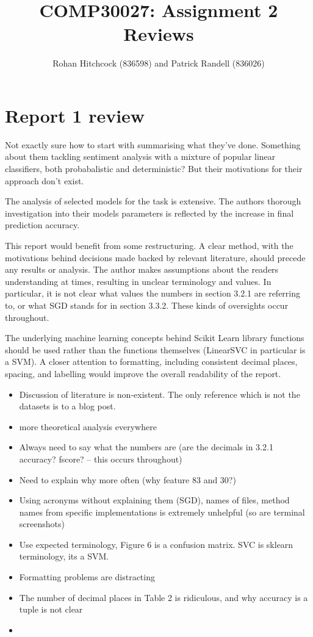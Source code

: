 \documentclass[11pt]{article}
\newcommand{\drafting}[1]{\textcolor{OliveGreen}{#1}}
\begin{document}
\title{\textbf{COMP30027: Assignment 2 Reviews}}
\author{Rohan Hitchcock (836598) and Patrick Randell (836026)}
\date{}
\maketitle

\section*{Report 1 review}

\drafting{
Not exactly sure how to start with summarising what they've done. Something about them tackling sentiment analysis with a mixture of popular linear classifiers, both probabalistic and deterministic? But their motivations for their approach don't exist.
}

The analysis of selected models for the task is extensive. The authors thorough investigation into their models parameters is reflected by the increase in final prediction accuracy.

This report would benefit from some restructuring. A clear method, with the motivations behind decisions made backed by relevant literature, should precede any results or analysis.
The author makes assumptions about the readers understanding at times, resulting in unclear terminology and values. In particular, it is not clear what values the numbers in section 3.2.1 are referring to, or what SGD stands for in section 3.3.2. These kinds of oversights occur throughout.

The underlying machine learning concepts behind Scikit Learn library functions should be used rather than the functions themselves (LinearSVC in particular is a SVM).
A closer attention to formatting, including consistent decimal places, spacing, and labelling would improve the overall readability of the report.

\begin{itemize}
    \item Discussion of literature is non-existent. The only reference which is not the datasets is to a blog post.
    \item more theoretical analysis everywhere 
    \item Always need to say what the numbers are (are the decimals in 3.2.1 accuracy? fscore? -- this occurs throughout)
    \item Need to explain why more often (why feature 83 and 30?)
    \item Using acronyms without explaining them (SGD), names of files, method names from specific implementations is extremely unhelpful (so are terminal screenshots)
    \item Use expected terminology, Figure 6 is a confusion matrix. SVC is sklearn terminology, its a SVM.
    \item Formatting problems are distracting 
    \item The number of decimal places in Table 2 is ridiculous, and why accuracy is a tuple is not clear
    \item 
\end{itemize}
\end{document}
